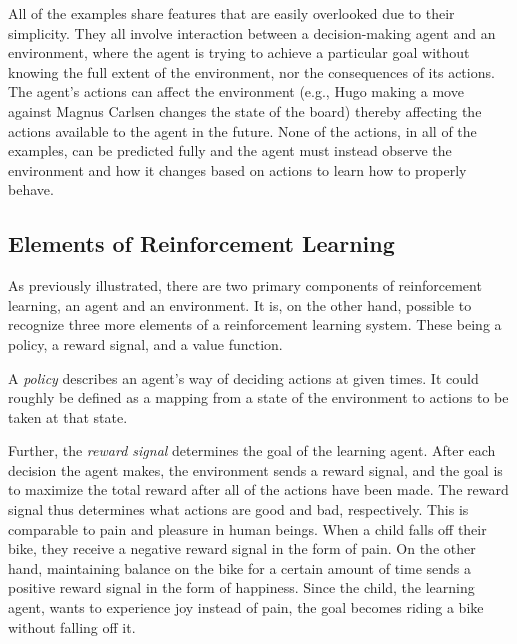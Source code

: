 \documentclass[titlepage]{article}
\begin{document}
\vskip 0.2cm

\noindent
All of the examples share features that are easily overlooked due to their simplicity. They all involve interaction between a decision-making agent and an environment, where the agent is trying to achieve a particular goal without knowing the full extent of the environment, nor the consequences of its actions. The agent's actions can affect the environment (e.g., Hugo making a move against Magnus Carlsen changes the state of the board) thereby affecting the actions available to the agent in the future. None of the actions, in all of the examples, can be predicted fully and the agent must instead observe the environment and how it changes based on actions to learn how to properly behave. 

\subsection{Elements of Reinforcement Learning}

\vskip 0.3cm

As previously illustrated, there are two primary components of reinforcement learning, an agent and an environment. It is, on the other hand, possible to recognize three more elements of a reinforcement learning system. These being a policy, a reward signal, and a value function. 

\vskip 0.3cm

\noindent
A \emph{policy} \cite{sutton} describes an agent's way of deciding actions at given times. It could roughly be defined as a mapping from a state of the environment to actions to be taken at that state. 
\vskip 0.3cm

\noindent
Further, the \emph{reward signal} \cite{sutton} determines the goal of the learning agent. After each decision the agent makes, the environment sends a reward signal, and the goal is to maximize the total reward after all of the actions have been made. The reward signal thus determines what actions are good and bad, respectively. This is comparable to pain and pleasure in human beings. When a child falls off their bike, they receive a negative reward signal in the form of pain. On the other hand, maintaining balance on the bike for a certain amount of time sends a positive reward signal in the form of happiness. Since the child, the learning agent, wants to experience joy instead of pain, the goal becomes riding a bike without falling off it. 

\vskip 0.3cm
\end{document}

